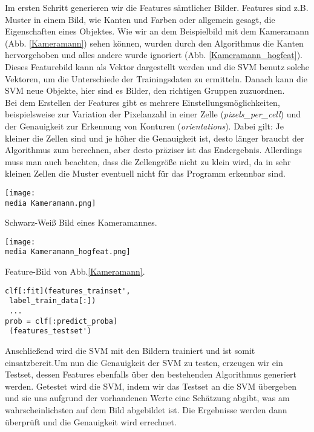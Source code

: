 Im ersten Schritt generieren wir die Features sämtlicher Bilder. Features sind z.B. Muster in einem Bild, wie Kanten und Farben oder allgemein gesagt, die Eigenschaften eines Objektes. Wie wir an dem Beispielbild mit dem Kameramann (Abb. \ref{Kameramann}) sehen können, wurden durch den Algorithmus die Kanten hervorgehoben und alles andere wurde ignoriert (Abb. \ref{Kameramann_hogfeat}). Dieses Featurebild kann als Vektor dargestellt werden und die SVM benutz solche Vektoren, um die Unterschiede der Trainingsdaten zu ermitteln. Danach kann die SVM neue Objekte, hier sind es Bilder, den richtigen Gruppen zuzuordnen.\\ 
Bei dem Erstellen der Features gibt es mehrere Einstellungsmöglichkeiten, beispielsweise zur Variation der Pixelanzahl in einer Zelle (\textit{pixels\_per\_cell}) und der Genauigkeit zur Erkennung von Konturen (\textit{orientations}). Dabei gilt: Je kleiner die Zellen sind und je höher die Genauigkeit ist, desto länger braucht der Algorithmus zum berechnen, aber desto präziser ist das Endergebnis. Allerdings muss man auch beachten, dass die Zellengröße nicht zu klein wird, da in sehr kleinen Zellen die Muster eventuell nicht für das Programm erkennbar sind. 

\begin{dsafigure}
\begin{center}
	\texttt{[image: \\media Kameramann.png]}
	\caption{Schwarz-Weiß Bild eines Kameramannes.}
	\label{Kameramann}
\end{center}
\end{dsafigure}

\begin{dsafigure}
\begin{center}
	\texttt{[image: \\media Kameramann\_hogfeat.png]}
	\caption{Feature-Bild von Abb.\ref{Kameramann}.}
	\label{Kameramann_hogfeat}
\end{center}
\end{dsafigure}

\begin{verbatim}
clf[:fit](features_trainset', 
 label_train_data[:])
 ...
prob = clf[:predict_proba]
 (features_testset')
\end{verbatim}

Anschließend wird die SVM mit den Bildern trainiert und ist somit einsatzbereit.Um nun die Genauigkeit der SVM zu testen, erzeugen wir ein Testset, dessen Features ebenfalls über den bestehenden Algorithmus generiert werden. Getestet wird die SVM, indem wir das Testset an die SVM übergeben und sie uns aufgrund der vorhandenen Werte eine Schätzung abgibt, was am wahrscheinlichsten auf dem Bild abgebildet ist. Die Ergebnisse werden dann überprüft und die Genauigkeit wird errechnet.

